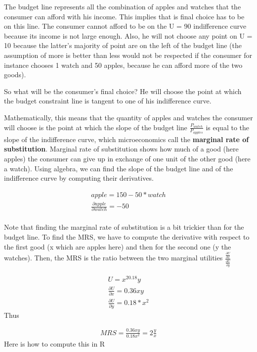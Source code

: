 \documentclass[
  letterpaper,
  DIV=11,
  numbers=noendperiod]{scrreprt}
\begin{document}
The budget line represents all the combination of apples and watches
that the consumer can afford with his income. This implies that is final
choice has to be on this line. The consumer cannot afford to be on the U
= 90 indifference curve because its income is not large enough. Also, he
will not choose any point on U = 10 because the latter's majority of
point are on the left of the budget line (the assumption of more is
better than less would not be respected if the consumer for instance
chooses 1 watch and 50 apples, because he can afford more of the two
goods).

So what will be the consumer's final choice? He will choose the point at
which the budget constraint line is tangent to one of his indifference
curve.

Mathematically, this means that the quantity of apples and watches the
consumer will choose is the point at which the slope of the budget line
\(\frac{P_{watch}}{P_{apples}}\) is equal to the slope of the
indifference curve, which microeconomics call the \textbf{marginal rate
of substitution}. Marginal rate of substitution shows how much of a good
(here apples) the consumer can give up in exchange of one unit of the
other good (here a watch). Using algebra, we can find the slope of the
budget line and of the indifference curve by computing their
derivatives.

\[
\begin{aligned}
apple = 150 - 50*watch
\\
\frac{\partial{apple}}{\partial{watch}} = -50
\\
\end{aligned}
\]

Note that finding the marginal rate of substitution is a bit trickier
than for the budget line. To find the MRS, we have to compute the
derivative with respect to the first good (x which are apples here) and
then for the second one (y the watches). Then, the MRS is the ratio
between the two marginal utilities
\(\frac{\frac{\partial{U}}{\partial{x}}}{\frac{\partial{U}}{\partial{y}}}\)

\[
\begin{aligned}
U = x^20.18y
\\
\frac{\partial{U}}{\partial{x}} = 0.36xy
\\
\frac{\partial{U}}{\partial{y}} = 0.18*x^2 
\end{aligned}
\] Thus

\[
\begin{aligned}
MRS = \frac{0.36xy}{0.18x^2} = 2\frac{y}{x}
\end{aligned}
\] Here is how to compute this in R
\end{document}
